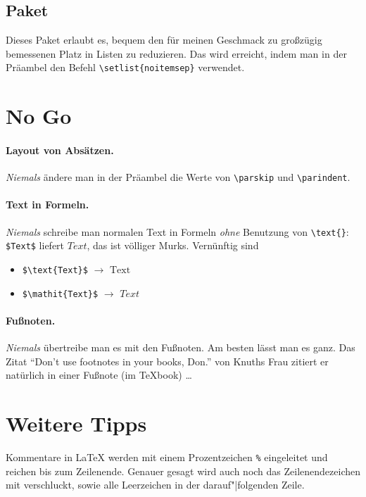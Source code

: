 \subsection{Paket }

Dieses Paket erlaubt es, bequem den für meinen Geschmack zu großzügig
bemessenen Platz in Listen zu reduzieren.
%
Das wird erreicht, indem man in der Präambel den Befehl
\verb|\setlist{noitemsep}| verwendet.

\section{No Go}
\label{sec:no-go}

\paragraph{Layout von Absätzen.} \emph{Niemals} 
%
ändere man in der Präambel die Werte von \verb|\parskip| und
\verb|\parindent|.

\paragraph{Text in Formeln.} \emph{Niemals}
%
schreibe man normalen Text in Formeln \emph{ohne} Benutzung von
\verb|\text{}|: \verb|$Text$| liefert $Text$, das ist völliger Murks.
Vernünftig sind
\begin{itemize}
\item \verb|$\text{Text}$| $\to$ $\text{Text}$
\item \verb|$\mathit{Text}$| $\to$ $\mathit{Text}$
\end{itemize}


\paragraph{Fußnoten.} \emph{Niemals}
%
übertreibe man es mit den Fußnoten.
%
Am besten lässt man es ganz.
%
Das Zitat "`Don't use footnotes in your books, Don."' von Knuths Frau zitiert
er natürlich in einer Fußnote (im \TeX book) \dots

\section{Weitere Tipps}
\label{sec:tipps}

Kommentare in \LaTeX{} werden mit einem Prozentzeichen \verb|%| eingeleitet
und reichen bis zum Zeilenende.
% 
Genauer gesagt wird auch noch das Zeilenendezeichen mit verschluckt, sowie
alle Leerzeichen in der darauf"|folgenden Zeile.


